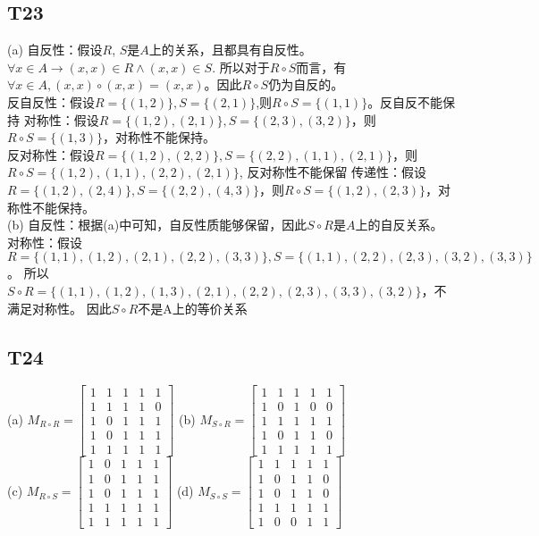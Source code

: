 \documentclass{article}
\begin{document}
\subsection{T23}
(a) 自反性：假设$R$, $S$是$A$上的关系，且都具有自反性。$\forall x \in A \rightarrow (x, x) \in R \land (x, x) \in S$.
所以对于$R \circ S$而言，有$\forall x \in A, (x, x) \circ (x, x) = (x, x)$。因此$R \circ S$仍为自反的。\\
反自反性：假设$R = \{(1, 2)\}, S = \{(2, 1)\}$,则$R \circ S = \{(1, 1)\}$。反自反不能保持
对称性：假设$R = \{(1, 2), (2, 1)\}, S = \{(2, 3), (3, 2)\}$，则$R \circ S = \{(1, 3)\}$，对称性不能保持。\\
反对称性：假设$R = \{(1, 2), (2, 2)\}, S = \{(2, 2), (1, 1), (2, 1)\}$，则$R \circ S = \{(1, 2), (1, 1), (2, 2), (2, 1)\}$,
反对称性不能保留
传递性：假设$R = \{(1, 2), (2, 4)\}, S = \{(2, 2), (4, 3)\}$，则$R \circ S = \{(1, 2), (2, 3)\}$，对称性不能保持。\\
(b) 自反性：根据(a)中可知，自反性质能够保留，因此$S \circ R$是$A$上的自反关系。\\
对称性：假设$R = \{(1, 1), (1, 2), (2, 1), (2, 2), (3, 3)\}, S = \{(1, 1), (2, 2), (2, 3), (3, 2), (3, 3)\}$。
所以$S \circ R = \{(1, 1), (1, 2), (1, 3), (2, 1), (2, 2), (2, 3), (3, 3), (3, 2)\}$，不满足对称性。
因此$S \circ R$不是A上的等价关系
\subsection{T24}
(a) $M_{R \circ R}= 
\begin{bmatrix}
    1 & 1 & 1 & 1 & 1\\
    1 & 1 & 1 & 1 & 0\\
    1 & 0 & 1 & 1 & 1\\
    1 & 0 & 1 & 1 & 1\\
    1 & 1 & 1 & 1 & 1
\end{bmatrix}$ \quad
(b) $M_{S \circ R} = 
\begin{bmatrix}
    1 & 1 & 1 & 1 & 1\\
    1 & 0 & 1 & 0 & 0\\
    1 & 1 & 1 & 1 & 1\\
    1 & 0 & 1 & 1 & 0\\
    1 & 1 & 1 & 1 & 1
\end{bmatrix}$\\
(c) $M_{R \circ S} = 
\begin{bmatrix}
    1 & 0 & 1 & 1 & 1\\
    1 & 0 & 1 & 1 & 1\\
    1 & 0 & 1 & 1 & 1\\
    1 & 1 & 1 & 1 & 1\\
    1 & 1 & 1 & 1 & 1
\end{bmatrix}$ \quad
(d) $M_{S \circ S} = 
\begin{bmatrix}
    1 & 1 & 1 & 1 & 1\\
    1 & 0 & 1 & 1 & 0\\
    1 & 0 & 1 & 1 & 0\\
    1 & 1 & 1 & 1 & 1\\
    1 & 0 & 0 & 1 & 1
\end{bmatrix}$
\end{document}
